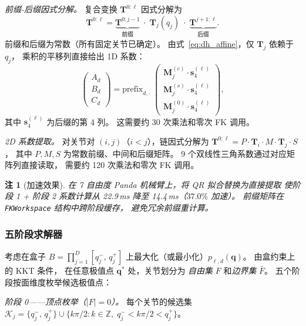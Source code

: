 \documentclass[journal]{IEEEtran}
\newtheorem{remark}{注}
\newcommand{\bT}{\mathbf{T}}
\begin{document}
\emph{前缀-后缀因式分解。}
复合变换 $\bT^{0:\ell}$ 因式分解为
\begin{equation}\label{eq:prefix_suffix}
  \bT^{0:\ell} = \underbrace{\bT^{0:j-1}}_\text{前缀}
  \;\cdot\; \bT_j(q_j)
  \;\cdot\; \underbrace{\bT^{j+1:\ell}}_\text{后缀}.
\end{equation}
前缀和后缀为常数（所有固定关节已确定）。
由式~\eqref{eq:dh_affine}，仅 $\bT_j$ 依赖于 $q_j$，
乘积的平移列直接给出 1D 系数：
\begin{equation}\label{eq:1d_direct}
  \begin{pmatrix} A_d \\ B_d \\ C_d \end{pmatrix}
  = \text{prefix}_{d,\cdot} \;
  \begin{pmatrix}
    \bm{M}_j^{(c)} \cdot \bm{s}^{(\ell)}_{4} \\
    \bm{M}_j^{(s)} \cdot \bm{s}^{(\ell)}_{4} \\
    \bm{M}_j^{(0)} \cdot \bm{s}^{(\ell)}_{4}
  \end{pmatrix},
\end{equation}
其中 $\bm{s}^{(\ell)}_4$ 为后缀的第 4 列。
这需要约 30 次乘法和零次 FK 调用。

\emph{2D 系数提取。}
对关节对 $(i,j)$（$i < j$），链因式分解为
$\bT^{0:\ell} = P \cdot \bT_i \cdot M \cdot \bT_j \cdot S$，
其中 $P,M,S$ 为常数前缀、中间和后缀矩阵。
9 个双线性三角系数通过对应矩阵列直接读取，
需要约 120 次乘法和零次 FK 调用。

\begin{remark}[加速效果]
在 7 自由度 Panda 机械臂上，将 QR 拟合替换为直接提取
使阶段 1 + 阶段 2 系数计算从 22.9\,ms 降至 14.4\,ms（$37.0\%$ 加速）。
前缀矩阵在 \texttt{FKWorkspace} 结构中跨阶段缓存，
避免冗余前缀重计算。
\end{remark}


\subsubsection{五阶段求解器}\label{sec:five_phase}

考虑在盒子 $B = \prod_{j=1}^{D} [q_j^-,\, q_j^+]$
上最大化（或最小化）$p_{\ell,d}(\bm{q})$。
由盒约束上的 KKT 条件，
在任意极值点 $\bm{q}^*$ 处，关节划分为
\emph{自由集} $F$ 和\emph{边界集} $\bar F$。
五个阶段按面维度枚举候选极值点：

\emph{阶段 0——顶点枚举（$|F|=0$）。}
每个关节的候选集
$\mathcal{K}_j = \{q_j^-,\, q_j^+\}
\cup \{ k\pi/2 : k\in \mathbb{Z},\;
q_j^- < k\pi/2 < q_j^+ \}$。
\end{document}
